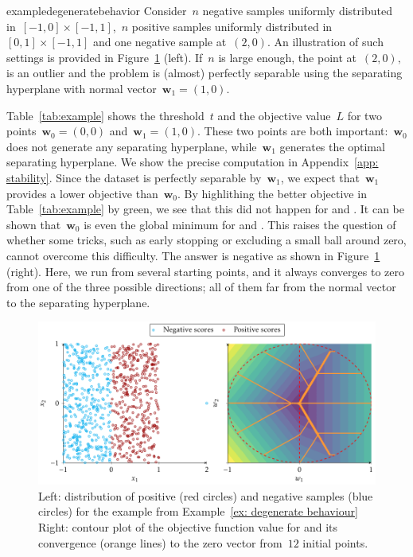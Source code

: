 \begin{restatable}{example}{degeneratebehavior}\label{ex: degenerate behaviour}
  Consider~$n$ negative samples uniformly distributed in~$[-1,0]\times[-1,1]$,~$n$ positive samples uniformly distributed in~$[0,1]\times[-1,1]$ and one negative sample at~$(2,0).$ An illustration of such settings is provided in Figure~\ref{fig: degenerate behaviour} (left). If~$n$ is large enough, the point at~$(2,0),$ is an outlier and the problem is (almost) perfectly separable using the separating hyperplane with normal vector~$\bm{w}_1 = (1, 0)$. 
\end{restatable}

Table~\ref{tab:example} shows the threshold~$t$ and the objective value~$L$ for two points~$\bm{w}_0=(0,0)$ and~$\bm{w}_1=(1,0)$. These two points are both important:~$\bm{w}_0$ does not generate any separating hyperplane, while~$\bm{w}_1$ generates the optimal separating hyperplane. We show the precise computation in Appendix~\ref{app: stability}. Since the dataset is perfectly separable by~$\bm{w}_1$, we expect that~$\bm{w}_1$ provides a lower objective than~$\bm{w}_0$. By highlithing the better objective in Table~\ref{tab:example} by green, we see that this did not happen for \TopPush and \TopMeanK. It can be shown that~$\bm{w}_0$ is even the global minimum for \TopPush and \TopMeanK. This raises the question of whether some tricks, such as early stopping or excluding a small ball around zero, cannot overcome this difficulty. The answer is negative as shown in Figure~\ref{fig: degenerate behaviour} (right). Here, we run \TopPush from several starting points, and it always converges to zero from one of the three possible directions; all of them far from the normal vector to the separating hyperplane.

\begin{figure}
  \centering
  \includegraphics[width=\linewidth]{images/toppush_convergence.pdf}
  \caption{Left: distribution of positive (red circles) and negative samples (blue circles) for the example from Example~\ref{ex: degenerate behaviour} Right: contour plot of the objective function value for \TopPush and its convergence (orange lines) to the zero vector from~$12$ initial points.}
  \label{fig: degenerate behaviour}
\end{figure}

